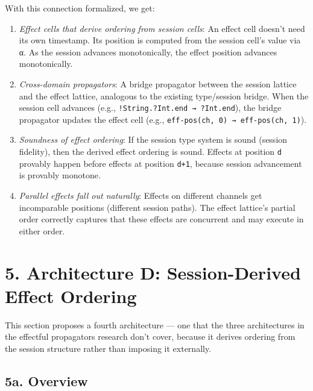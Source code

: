 \documentclass[11pt]{article}
\begin{document}
With this connection formalized, we get:

\begin{enumerate}
\item \emph{Effect cells that derive ordering from session cells}: An effect cell
doesn't need its own timestamp. Its position is computed from the session
cell's value via α. As the session advances monotonically, the effect
position advances monotonically.

\item \emph{Cross-domain propagators}: A bridge propagator between the session lattice
and the effect lattice, analogous to the existing type/session bridge.
When the session cell advances (e.g., \texttt{!String.?Int.end → ?Int.end}), the
bridge propagator updates the effect cell (e.g., \texttt{eff-pos(ch, 0) → eff-pos(ch, 1)}).

\item \emph{Soundness of effect ordering}: If the session type system is sound
(session fidelity), then the derived effect ordering is sound. Effects at
position \texttt{d} provably happen before effects at position \texttt{d+1}, because
session advancement is provably monotone.

\item \emph{Parallel effects fall out naturally}: Effects on different channels get
incomparable positions (different session paths). The effect lattice's partial
order correctly captures that these effects are concurrent and may execute in
either order.
\end{enumerate}
\section{5. Architecture D: Session-Derived Effect Ordering}
\label{sec:org3962c18}

This section proposes a fourth architecture — one that the three architectures
in the effectful propagators research don't cover, because it derives ordering
from the session structure rather than imposing it externally.
\subsection{5a. Overview}
\label{sec:org3807ae0}
\end{document}
